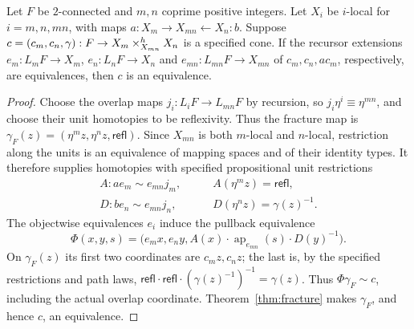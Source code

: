 \begin{lemma}\label{lem:unit-fracture-cone}
Let $F$ be $2$-connected and $m,n$ coprime positive integers. Let $X_i$ be $i$-local for $i=m,n,mn$, with maps $a:X_m\to X_{mn}\leftarrow X_n:b$. Suppose
$c=(c_m,c_n,\gamma):F\to X_m\mathbin{\times}^{h}_{X_{mn}}X_n$ is a specified cone. If the recursor extensions $e_m:L_mF\to X_m$, $e_n:L_nF\to X_n$ and $e_{mn}:L_{mn}F\to X_{mn}$ of $c_m,c_n,a c_m$, respectively, are equivalences, then $c$ is an equivalence.
\end{lemma}
\begin{proof}
Choose the overlap maps $j_i:L_iF\to L_{mn}F$ by recursion, so $j_i\eta^i\equiv\eta^{mn}$, and choose their unit homotopies to be reflexivity. Thus the fracture map is $\gamma_F(z)=(\eta^mz,\eta^nz,\mathsf{refl})$. Since $X_{mn}$ is both $m$-local and $n$-local, restriction along the units is an equivalence of mapping spaces and of their identity types. It therefore supplies homotopies with specified propositional unit restrictions
\[
\begin{aligned}
A:a e_m\sim e_{mn}j_m,&\qquad A(\eta^mz)=\mathsf{refl},\\
D:b e_n\sim e_{mn}j_n,&\qquad D(\eta^nz)=\gamma(z)^{-1}.
\end{aligned}
\]
The objectwise equivalences $e_i$ induce the pullback equivalence
\[
\Phi(x,y,s)=\bigl(e_mx,e_ny,
 A(x)\cdot\operatorname{ap}_{e_{mn}}(s)\cdot D(y)^{-1}\bigr).
\]
On $\gamma_F(z)$ its first two coordinates are $c_mz,c_nz$; the last is, by the specified restrictions and path laws,
$\mathsf{refl}\cdot\mathsf{refl}\cdot(\gamma(z)^{-1})^{-1}=\gamma(z)$.
Thus $\Phi\gamma_F\sim c$, including the actual overlap coordinate. Theorem~\ref{thm:fracture} makes $\gamma_F$, and hence $c$, an equivalence.
\end{proof}

